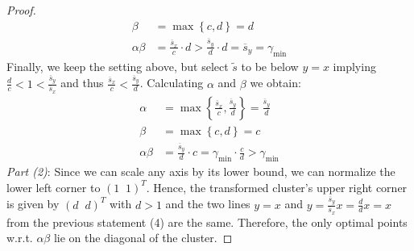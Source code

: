 \documentclass{article}
\begin{document}
\begin{proof}
\begin{align*}
	\beta &= \max \left\{ c, d \right\} = d\\
	\alpha\beta &= \frac{\overline{s}_x}{c} \cdot d > \frac{\overline{s}_y}{d} \cdot d = \overline{s}_y = \gamma_{\min}
	\end{align*}
	Finally, we keep the setting above, but select $\tilde{s}$ to be below $y=x$ implying $\frac{d}{c} < 1 < \frac{\overline{s}_y}{\overline{s}_x}$ and thus $\frac{\overline{s}_x}{c} < \frac{\overline{s}_y}{d}$. Calculating $\alpha$ and $\beta$ we obtain:
	\begin{align*}
	\alpha &= \max \left\{ \frac{\overline{s}_x}{c}, \frac{\overline{s}_y}{d} \right\} = \frac{\overline{s}_y}{d}\\
	\beta &= \max \left\{ c, d \right\} = c\\
	\alpha\beta &= \frac{\overline{s}_y}{d} \cdot c = \gamma_{\min} \cdot \frac{c}{d} > \gamma_{\min}
	\end{align*}
	\emph{Part (2)}: Since we can scale any axis by its lower bound, we can normalize the lower left corner to $(1 \;\; 1)^T$. Hence, the transformed cluster's upper right corner is given by $(d \;\; d)^T$ with $d>1$ and the two lines $y=x$ and $y=\frac{\overline{s}_y}{\overline{s}_x}x = \frac{d}{d} x = x$ from the previous statement (4) are the same. Therefore, the only optimal points w.r.t. $\alpha\beta$ lie on the diagonal of the cluster.
\end{proof}
\end{document}
